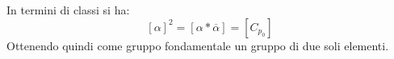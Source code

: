\begin{itemize}
\begin{center}
		\end{center}
		In termini di classi si ha:
		\begin{equation*}
			\left[\alpha\right]^2=\left[\alpha\ast\overline{\alpha}\right]=\left[C_{p_0}\right]
		\end{equation*}
		Ottenendo quindi come gruppo fondamentale un gruppo di due soli elementi.
	\end{itemize}
